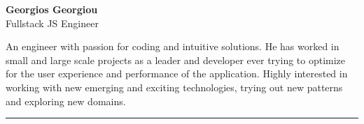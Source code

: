 \documentclass[10pt,a4paper]{article}
\begin{document}
{\Huge\bfseries\color{accent}Georgios Georgiou}\\[2pt]
{\large\color{muted}Fullstack JS Engineer}\par
\vspace{6pt}
\justifying
An engineer with passion for coding and intuitive solutions. He has worked in small
and large scale projects as a leader and developer ever trying to optimize for the
user experience and performance of the application. Highly interested in working
with new emerging and exciting technologies, trying out new patterns and exploring
new domains.
\vspace{6pt}
{\color{accent}\rule{\linewidth}{0.8pt}}
\vspace{4pt}

\end{document}
